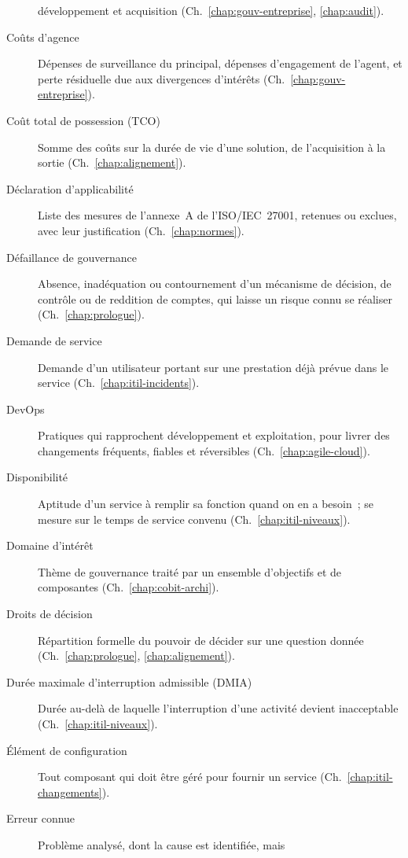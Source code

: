 \begin{description}
          développement et acquisition (Ch.~\ref{chap:gouv-entreprise},
          \ref{chap:audit}).
    \item[Coûts d'agence] Dépenses de surveillance du principal, dépenses
          d'engagement de l'agent, et perte résiduelle due aux divergences
          d'intérêts (Ch.~\ref{chap:gouv-entreprise}).
    \item[Coût total de possession (TCO)] Somme des coûts sur la durée de vie
          d'une solution, de l'acquisition à la sortie
          (Ch.~\ref{chap:alignement}).
    \item[Déclaration d'applicabilité] Liste des mesures de l'annexe~A de
          l'ISO/IEC~27001, retenues ou exclues, avec leur justification
          (Ch.~\ref{chap:normes}).
    \item[Défaillance de gouvernance] Absence, inadéquation ou contournement
          d'un mécanisme de décision, de contrôle ou de reddition de
          comptes, qui laisse un risque connu se réaliser
          (Ch.~\ref{chap:prologue}).
    \item[Demande de service] Demande d'un utilisateur portant sur une
          prestation déjà prévue dans le service (Ch.~\ref{chap:itil-incidents}).
    \item[DevOps] Pratiques qui rapprochent développement et exploitation,
          pour livrer des changements fréquents, fiables et réversibles
          (Ch.~\ref{chap:agile-cloud}).
    \item[Disponibilité] Aptitude d'un service à remplir sa fonction quand on
          en a besoin~; se mesure sur le temps de service convenu
          (Ch.~\ref{chap:itil-niveaux}).
    \item[Domaine d'intérêt] Thème de gouvernance traité par un ensemble
          d'objectifs et de composantes (Ch.~\ref{chap:cobit-archi}).
    \item[Droits de décision] Répartition formelle du pouvoir de décider sur
          une question donnée (Ch.~\ref{chap:prologue},
          \ref{chap:alignement}).
    \item[Durée maximale d'interruption admissible (DMIA)] Durée au-delà de
          laquelle l'interruption d'une activité devient inacceptable
          (Ch.~\ref{chap:itil-niveaux}).
    \item[Élément de configuration] Tout composant qui doit être géré pour
          fournir un service (Ch.~\ref{chap:itil-changements}).
    \item[Erreur connue] Problème analysé, dont la cause est identifiée, mais

\end{description}
